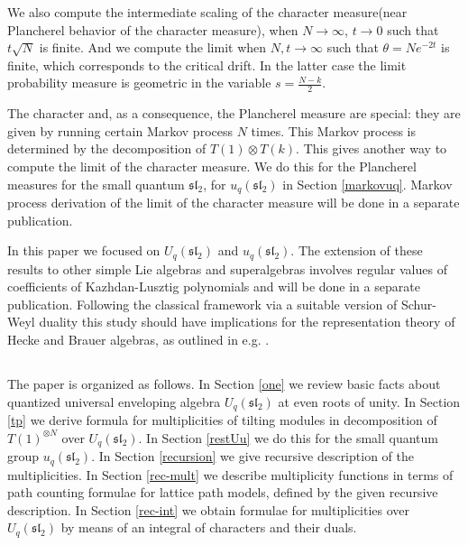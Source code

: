 \documentclass[11pt]{amsart}
\begin{document}
We also compute the intermediate scaling of the character measure(near Plancherel behavior of the character measure), when $N\to\infty$, $t\to0$ such that $t\sqrt{N}$ is finite. And we compute the limit when $N,t\to\infty$ such that $\theta=N e^{-2t}$ is finite, which corresponds to the critical drift. In the latter case the limit probability measure is geometric in the variable $s=\frac{N-k}{2}$.


The character and, as a consequence, the Plancherel measure are special: they are given by running certain Markov process $N$ times. This Markov process is determined by the decomposition of $T(1)\otimes T(k)$. This gives another way to compute the limit of the character measure. We do this for the Plancherel measures for the small quantum $\mathfrak{sl}_2$, for $u_q(\mathfrak{sl}_2)$ in Section \ref{markovuq}. Markov process derivation of the limit of the character measure will be done in a separate publication.


In this paper we focused on $U_q(\mathfrak{sl}_2)$ and $u_q(\mathfrak{sl}_2)$. The extension of these results to other simple Lie algebras and superalgebras involves regular values of coefficients of Kazhdan-Lusztig polynomials and will be done in a separate publication. Following the classical framework via a suitable version of Schur-Weyl duality this study should have implications for the representation theory of Hecke and Brauer algebras, as outlined in e.g. \cite{AST}.


\subsection{} The paper is organized as follows. In Section \ref{one} we review basic facts about quantized universal enveloping algebra $U_q(\mathfrak{sl}_2)$ at even roots of unity. In Section \ref{tp} we derive formula for multiplicities of tilting modules in decomposition of $T(1)^{\otimes N}$ over $U_q(\mathfrak{sl}_2)$. In Section \ref{restUu} we do this for the small quantum group $u_q(\mathfrak{sl}_2)$. In Section \ref{recursion} we give recursive description of the multiplicities. In Section \ref{rec-mult} we describe multiplicity functions in terms of path counting formulae for lattice path models, defined by the given recursive description. In Section \ref{rec-int} we obtain formulae for multiplicities over $U_q(\mathfrak{sl}_2)$ by means of an integral of characters and their duals. 
\end{document}
